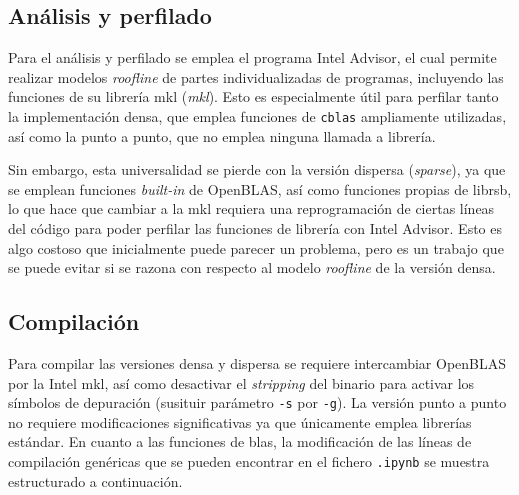 \subsection{Análisis y perfilado}
\label{ssec:analisis_perfilado_metodologia}
Para el análisis y perfilado se emplea el programa Intel Advisor, el cual permite realizar modelos \textit{roofline} de partes individualizadas de programas, incluyendo las funciones de su librería \acrshort{mkl} (\textit{\acrlong{mkl}}). Esto es especialmente útil para perfilar tanto la implementación densa, que emplea funciones de \texttt{cblas} ampliamente utilizadas, así como la punto a punto, que no emplea ninguna llamada a librería.

Sin embargo, esta universalidad se pierde con la versión dispersa (\textit{sparse}), ya que se emplean funciones \textit{built-in} de OpenBLAS, así como funciones propias de librsb, lo que hace que cambiar a la \acrshort{mkl} requiera una reprogramación de ciertas líneas del código para poder perfilar las funciones de librería con Intel Advisor. Esto es algo costoso que inicialmente puede parecer un problema, pero es un trabajo que se puede evitar si se razona con respecto al modelo \textit{roofline} de la versión densa.

\subsection{Compilación}
\label{ssec:compilacion_metodologia}
Para compilar las versiones densa y dispersa se requiere intercambiar OpenBLAS por la Intel \acrshort{mkl}, así como desactivar el \textit{stripping} del binario para activar los símbolos de depuración (susituir parámetro \texttt{-s} por \texttt{-g}). La versión punto a punto no requiere modificaciones significativas ya que únicamente emplea librerías estándar. En cuanto a las funciones de \acrshort{blas}, la modificación de las líneas de compilación genéricas que se pueden encontrar en el fichero \texttt{.ipynb} se muestra estructurado a continuación.

